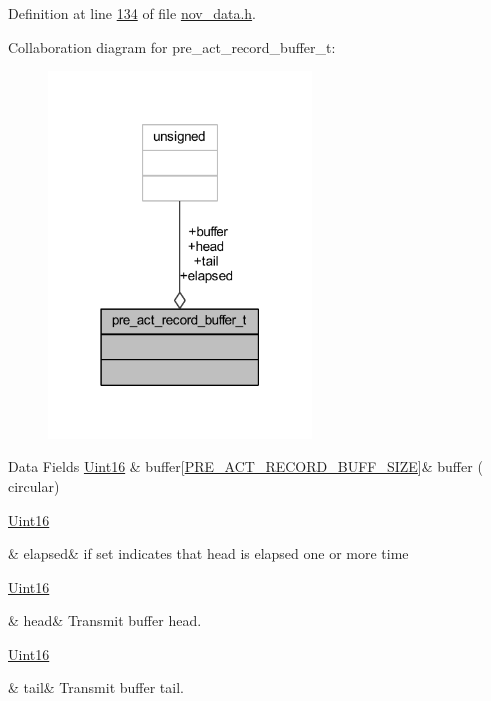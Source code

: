 Definition at line \hyperlink{a00022_source_l00134}{134} of file \hyperlink{a00022_source}{nov\+\_\+data.\+h}.



Collaboration diagram for pre\+\_\+act\+\_\+record\+\_\+buffer\+\_\+t\+:\nopagebreak
\begin{figure}[H]
\begin{center}
\leavevmode
\includegraphics[width=198pt]{d2/ddd/a00978}
\end{center}
\end{figure}
\begin{DoxyFields}{Data Fields}
\hypertarget{a00022_ad611012074e252bf84c1cfb8c273dd79}{\hyperlink{a00072_a59a9f6be4562c327cbfb4f7e8e18f08b}{Uint16}}\label{a00022_ad611012074e252bf84c1cfb8c273dd79}
&
buffer\mbox{[}\hyperlink{a00022_a18dcecc16ded13fa622e0913e73442e6}{P\+R\+E\+\_\+\+A\+C\+T\+\_\+\+R\+E\+C\+O\+R\+D\+\_\+\+B\+U\+F\+F\+\_\+\+S\+I\+Z\+E}\mbox{]}&
buffer ( circular) \\
\hline

\hypertarget{a00022_abecaedb3605e8bca8335cd81ca63025f}{\hyperlink{a00072_a59a9f6be4562c327cbfb4f7e8e18f08b}{Uint16}}\label{a00022_abecaedb3605e8bca8335cd81ca63025f}
&
elapsed&
if set indicates that head is elapsed one or more time \\
\hline

\hypertarget{a00022_a15a6827ccabba1c22396eccc1c5c654b}{\hyperlink{a00072_a59a9f6be4562c327cbfb4f7e8e18f08b}{Uint16}}\label{a00022_a15a6827ccabba1c22396eccc1c5c654b}
&
head&
Transmit buffer head. \\
\hline

\hypertarget{a00022_ab3bcc08acd9d73ce1a44992255658e37}{\hyperlink{a00072_a59a9f6be4562c327cbfb4f7e8e18f08b}{Uint16}}\label{a00022_ab3bcc08acd9d73ce1a44992255658e37}
&
tail&
Transmit buffer tail. \\
\hline

\end{DoxyFields}
\label{db/dbc/a00395}
\hypertarget{a00022_db/dbc/a00395}{}
